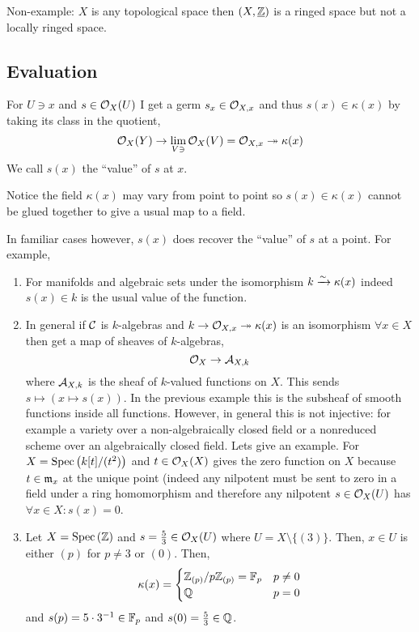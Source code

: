 \documentclass[12pt]{article}
\begin{document}
\begin{example}
Non-example: $X$ is any topological space then $(X, \underline{\mathbb{Z}})$ is a ringed space but not a locally ringed space. 
\end{example}

\subsection{Evaluation}

For $U \ni x$ and $s \in \mathcal{O}_{X}(U)$ I get a germ $s_x \in \mathcal{O}_{X, x}$ and thus $s(x) \in \kappa(x)$ by taking its class in the quotient,
\[ \mathcal{O}_{X}(Y) \to \lim_{V \ni} \mathcal{O}_{X}(V) = \mathcal{O}_{X, x} \twoheadrightarrow \kappa(x) \]
We call $s(x)$ the ``value'' of $s$ at $x$.

\begin{rmk}
Notice the field $\kappa(x)$ may vary from point to point so $s(x) \in \kappa(x)$ cannot be glued together to give a usual map to a field. 
\end{rmk}

\begin{example}
In familiar cases however, $s(x)$ does recover the ``value'' of $s$ at a point. For example,
\begin{enumerate}
\item For manifolds and algebraic sets under the isomorphism $k \xrightarrow{\sim} \kappa(x)$ indeed $s(x) \in k$ is the usual value of the function.
\item In general if $\mathcal{C}$ is $k$-algebras and $k \to \mathcal{O}_{X, x} \twoheadrightarrow \kappa(x)$ is an isomorphism $\forall x \in X$ then get a map of sheaves of $k$-algebras,
\[ \mathcal{O}_{X} \to \mathcal{A}_{X,k} \]
where $\mathcal{A}_{X,k}$ is the sheaf of $k$-valued functions on $X$. This sends $s \mapsto (x \mapsto s(x))$. In the previous example this is the subsheaf of smooth functions inside all functions. However, in general this is not injective: for example a variety over a non-algebraically closed field or a nonreduced scheme over an algebraically closed field. Lets give an example. For $X = \mathrm{Spec}\left( k[t]/(t^2) \right)$ and $t \in \mathcal{O}_{X}(X)$ gives the zero function on $X$ because $t \in \mathfrak{m}_x$ at the unique point (indeed any nilpotent must be sent to zero in a field under a ring homomorphism and therefore any nilpotent $s \in \mathcal{O}_{X}(U)$ has $\forall x \in X : s(x) = 0$.
\item Let $X = \mathrm{Spec}\left( \mathbb{Z} \right)$ and $s = \frac{5}{3} \in \mathcal{O}_{X}(U)$ where $U = X \setminus \{ (3) \}$. Then, $x \in U$ is either $(p)$ for $p \neq 3$ or $(0)$. Then,
\[ \kappa(x) = \begin{cases}
\mathbb{Z}_{(p)} / p \mathbb{Z}_{(p)} = \mathbb{F}_p & p \neq 0
\\
\mathbb{Q} & p = 0
\end{cases} \]
and $s(p) = 5 \cdot 3^{-1} \in \mathbb{F}_p$ and $s(0) = \frac{5}{3} \in \mathbb{Q}$.
\end{enumerate}
\end{example}
\end{document}
